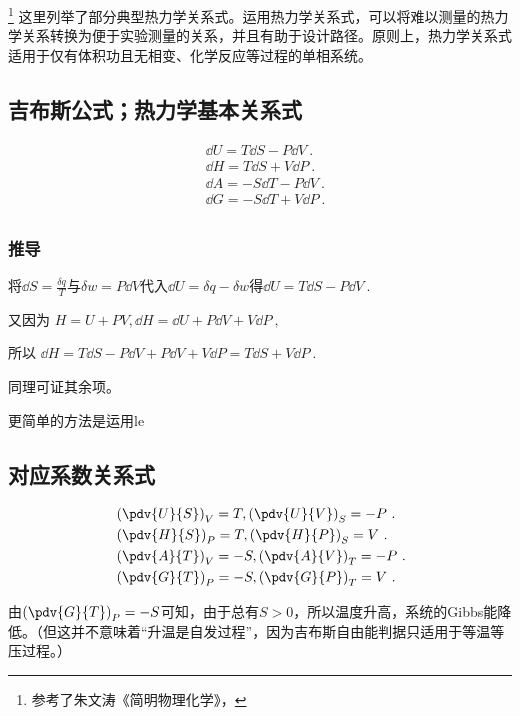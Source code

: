 
\footnote{参考了朱文涛《简明物理化学》，}
这里列举了部分典型热力学关系式。运用热力学关系式，可以将难以测量的热力学关系转换为便于实验测量的关系，并且有助于设计路径。原则上，热力学关系式适用于仅有体积功且无相变、化学反应等过程的单相系统。

\subsection{吉布斯公式；热力学基本关系式}
\begin{align}\label{eq_MWRel_4}
&\dd U = T \dd S - P \dd V~.\\
&\dd H = T \dd S + V \dd P~.\\
&\dd A = -S \dd T - P \dd V~.\\
&\dd G = -S \dd T +V \dd P~.\\
\end{align}

\subsubsection{推导}
将$\dd S = \frac{\delta q}{T}$与$\delta w = P\dd V$代入$\dd U=\delta q-\delta w$得$\dd U = T \dd S - P \dd V~.$

又因为 $H=U+PV, \dd H = \dd U + P \dd V + V \dd P~,$

所以 $\dd H = T \dd S - P \dd V+ P \dd V + V \dd P = T \dd S + V \dd P~.$

同理可证其余项。

更简单的方法是运用le

\subsection{对应系数关系式}
\begin{align}
&\left(\pdv{U}{S}\right)_V=T, \left(\pdv{U}{V}\right)_S=-P~.
\\
&\left(\pdv{H}{S}\right)_P=T, \left(\pdv{H}{P}\right)_S=V~.
\\
&\left(\pdv{A}{T}\right)_V=-S, \left(\pdv{A}{V}\right)_T=-P~.
\\
&\left(\pdv{G}{T}\right)_P=-S, \left(\pdv{G}{P}\right)_T=V~.
\end{align}

由$\left(\pdv{G}{T}\right)_P=-S$可知，由于总有$S>0$，所以温度升高，系统的Gibbs能降低。（但这并不意味着“升温是自发过程”，因为吉布斯自由能判据只适用于等温等压过程。）


